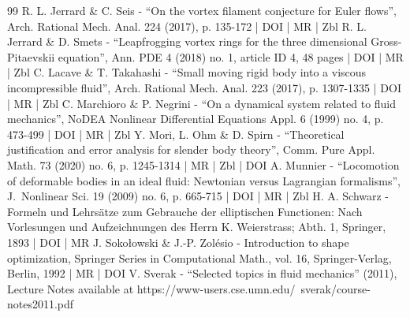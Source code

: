 \documentclass[10pt]{amsart}
\theoremstyle{definition}
\begin{document}
\begin{thebibliography}{99}
R. L. Jerrard \& C. Seis - “On the vortex filament conjecture for Euler flows”, Arch. Rational Mech. Anal. 224 (2017), p. 135-172 | DOI | MR | Zbl
R. L. Jerrard \& D. Smets - “Leapfrogging vortex rings for the three dimensional Gross-Pitaevskii equation”, Ann. PDE 4 (2018) no. 1, article ID 4, 48 pages | DOI | MR | Zbl
C. Lacave \& T. Takahashi - “Small moving rigid body into a viscous incompressible fluid”, Arch. Rational Mech. Anal. 223 (2017), p. 1307-1335 | DOI | MR | Zbl
C. Marchioro \& P. Negrini - “On a dynamical system related to fluid mechanics”, NoDEA Nonlinear Differential Equations Appl. 6 (1999) no. 4, p. 473-499 | DOI | MR | Zbl
Y. Mori, L. Ohm \& D. Spirn - “Theoretical justification and error analysis for slender body theory”, Comm. Pure Appl. Math. 73 (2020) no. 6, p. 1245-1314 | MR | Zbl | DOI
A. Munnier - “Locomotion of deformable bodies in an ideal fluid: Newtonian versus Lagrangian formalisms”, J. Nonlinear Sci. 19 (2009) no. 6, p. 665-715 | DOI | MR | Zbl
H. A. Schwarz - Formeln und Lehrsätze zum Gebrauche der elliptischen Functionen: Nach Vorlesungen und Aufzeichnungen des Herrn K. Weierstrass; Abth. 1, Springer, 1893 | DOI | MR
J. Sokołowski \& J.-P. Zolésio - Introduction to shape optimization, Springer Series in Computational Math., vol. 16, Springer-Verlag, Berlin, 1992 | MR | DOI
V. Sverak - “Selected topics in fluid mechanics” (2011), Lecture Notes available at https://www-users.cse.umn.edu/~sverak/course-notes2011.pdf
\end{thebibliography}
\end{document}
